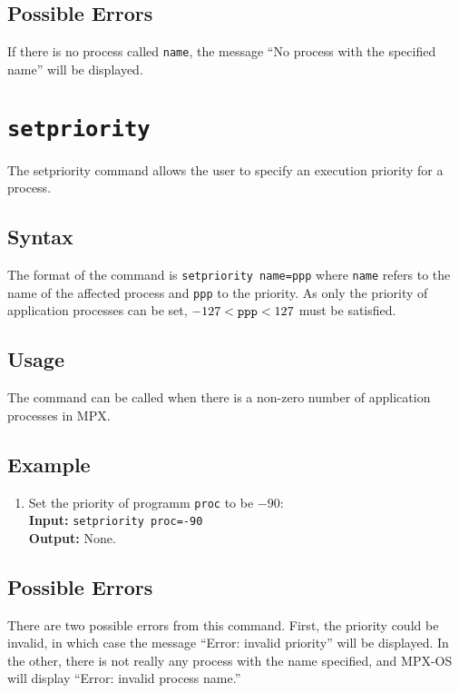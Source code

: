 \subsection{Possible Errors}

If there is no process called {\tt name}, the message ``No process with the specified name''
will be displayed.







\section{\tt setpriority}
\label{setpriority_cmd}

The setpriority command allows the user to specify an execution priority for a process.

\subsection{Syntax}
The format of the command is {\tt setpriority name=ppp} where {\tt name} refers to the 
name of the affected process and {\tt ppp} to the priority. As only the priority of 
application processes can be set, $-127 < {\tt ppp} < 127$ must be satisfied.

\subsection{Usage}
The command can be called when there is a non-zero number of application processes in MPX.

\subsection{Example}
\begin{enumerate}
    \item Set the priority of programm {\tt proc} to be $-90$: \\
        {\bf Input:} {\tt setpriority proc=-90} \\
        {\bf Output:} None.
\end{enumerate}
\subsection{Possible Errors}

There are two possible errors from this command. First, the priority could be invalid, in
which case the message ``Error: invalid priority'' will be displayed. In the other, there
is not really any process with the name specified, and MPX-OS will display ``Error: invalid
process name.''







